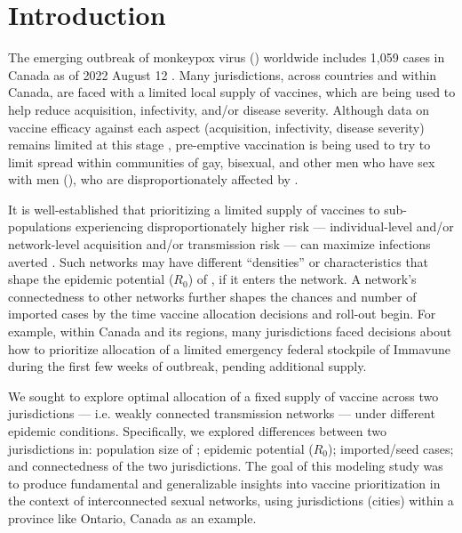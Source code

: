 \section{Introduction}
The emerging outbreak of monkeypox virus (\MPXV) worldwide includes
1,059 cases in Canada as of 2022 August 12 \cite{PHAC2022epi}.
Many jurisdictions, across countries and within Canada,
are faced with a limited local supply of vaccines,
which are being used to help reduce acquisition, infectivity, and/or disease severity.
Although data on vaccine efficacy against each aspect (acquisition, infectivity, disease severity)
remains limited at this stage \cite{Fine1988,PHAC2022imvamune,CDC2022vax},
pre-emptive vaccination is being used to try to limit \MPXV spread
within communities of gay, bisexual, and other men who have sex with men (\GBMSM),
who are disproportionately affected by \MPXV.
\par
It is well-established that prioritizing a limited supply of vaccines
to sub-populations experiencing disproportionately higher risk
--- individual-level and/or network-level acquisition and/or transmission risk ---
can maximize infections averted \cite{Garnett2005,Mishra2021}.
Such networks may have different ``densities'' or characteristics that shape
the epidemic potential ($R_0$) of \MPXV, if it enters the network.
A network's connectedness to other networks further shapes
the chances and number of imported cases
by the time vaccine allocation decisions and roll-out begin.
For example, within Canada and its regions, many jurisdictions
faced decisions about how to prioritize allocation of
a limited emergency federal stockpile of Immavune\rtm \cite{PHAC2022imvamune}
during the first few weeks of \MPXV outbreak, pending additional supply.
\par
We sought to explore optimal allocation of a fixed supply of \MPXV vaccine
across two jurisdictions --- i.e. weakly connected transmission networks ---
under different epidemic conditions.
Specifically, we explored differences between two jurisdictions in:
population size of \GBMSM; epidemic potential ($R_0$); imported/seed cases;
and connectedness of the two jurisdictions.
The goal of this modeling study was to produce fundamental and generalizable insights into
\MPXV vaccine prioritization in the context of interconnected sexual networks,
using jurisdictions (cities) within a province like Ontario, Canada as an example.
